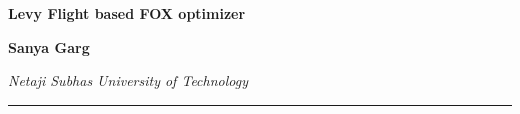 \documentclass[
]{article}
\author{}
\date{}
\begin{document}
\justify

\begin{center}
{\Large \textbf{Levy Flight based FOX optimizer}}\\
\end{center}


\begin{center}
{\fontsize{10}{14}\selectfont \textbf{Sanya Garg}}
\end{center}

\begin{center}
\emph{Netaji Subhas University of Technology}\\
\vspace{3em} %
\hrule
\end{center}

\vspace{1em} 
\end{document}

